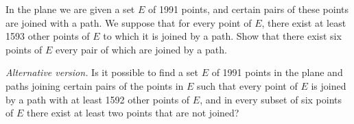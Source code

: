 In the plane we are given a set $E$ of 1991 points, and certain pairs of these points are joined with a path. We suppose that for every point of $E$, there exist at least 1593 other points of $E$ to which it is joined by a path. Show that there exist six points of $E$ every pair of which are joined by a path.

\textit{Alternative version.} Is it possible to find a set $E$ of 1991 points in the plane and paths joining certain pairs of the points in $E$ such that every point of $E$ is joined by a path with at least 1592 other points of $E$, and in every subset of six points of $E$ there exist at least two points that are not joined?
